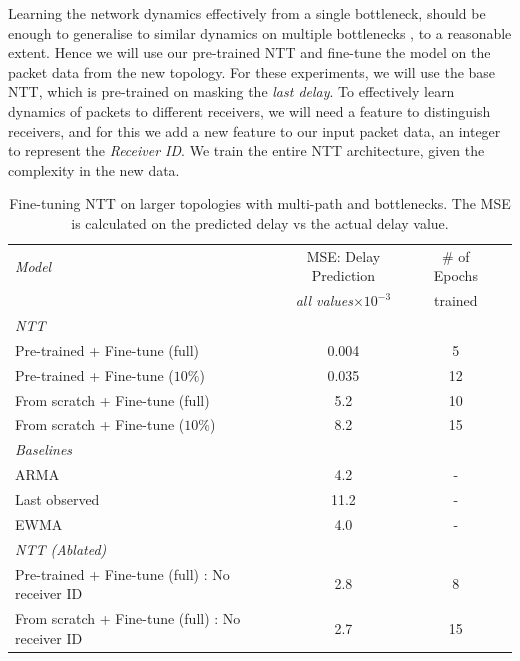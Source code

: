 Learning the network dynamics effectively from a single bottleneck, should be enough to generalise to similar dynamics on multiple bottlenecks , to a reasonable extent. Hence we will use our pre-trained NTT and fine-tune the model on the packet data from the new topology. For these experiments, we will use the base NTT, which is pre-trained on masking the \emph{last delay}. To effectively learn dynamics of packets to different receivers, we will need a feature to distinguish receivers, and for this we add a new feature to our input packet data, an integer to represent the \emph{Receiver ID}. We train the entire NTT architecture, given the complexity in the new data.

\begin{table}[htbp]
\centering
\begin{tabular}{ l   c   c  c }
\toprule
\emph{Model} &  MSE: Delay Prediction & \# of Epochs    \\
			&		\emph{all values$\times10^{-3}$}  & trained 	\\ 
			

\midrule
\em{NTT}                                                               &       \\                                      
    \smallindent Pre-trained  +   Fine-tune (full)                                  & 0.004   &     5    \\                  
    \smallindent Pre-trained  +   Fine-tune ($10\%$)                                  & 0.035   & 12  \\                        
    \smallindent From scratch  + Fine-tune (full)                                       & 5.2    &   10 \\                      
     \smallindent From scratch  + Fine-tune ($10\%$)                                    & 8.2  & 15 \\                          
 \em{Baselines} &       \\  
    \smallindent ARMA  &       					4.2	& - \\  
    \smallindent Last observed &     				11.2	& -  \\  
    \smallindent  	EWMA &     					4.0	& -  \\  
\em{NTT (Ablated)}           &       \\       
     \smallindent Pre-trained  +   Fine-tune (full)  : No receiver ID                              & 2.8   &     8    \\   
      \smallindent From scratch  + Fine-tune (full) : No receiver ID                                  & 2.7    & 15  \\         
 
 \bottomrule

\end{tabular}
\caption{Fine-tuning NTT on larger topologies with multi-path and bottlenecks. The MSE is calculated on the predicted delay vs the actual delay value.}
\label{eval:table5}
\end{table}

